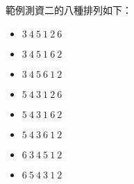 \documentclass[11pt,a4paper]{article}
\begin{document}
\newpage
範例測資二的八種排列如下：
\begin{itemize}
	\item $3\ 4\ 5\ 1\ 2\ 6$
	\item $3\ 4\ 5\ 1\ 6\ 2$
	\item $3\ 4\ 5\ 6\ 1\ 2$
	\item $5\ 4\ 3\ 1\ 2\ 6$
	\item $5\ 4\ 3\ 1\ 6\ 2$
	\item $5\ 4\ 3\ 6\ 1\ 2$
	\item $6\ 3\ 4\ 5\ 1\ 2$
	\item $6\ 5\ 4\ 3\ 1\ 2$
\end{itemize}
\end{document}
